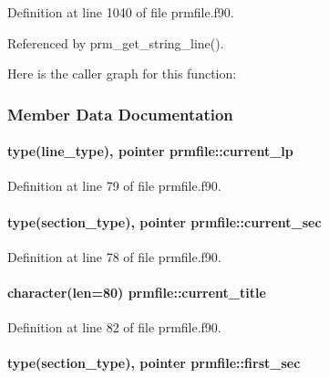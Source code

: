 Definition at line 1040 of file prmfile.\-f90.



Referenced by prm\-\_\-get\-\_\-string\-\_\-line().



Here is the caller graph for this function\-:




\subsubsection{Member Data Documentation}
\hypertarget{classprmfile_a50199e70faf66f6bb161f0c8584321e3}{
\paragraph[{current\-\_\-lp}]{\setlength{\rightskip}{0pt plus 5cm}type({\bf line\-\_\-type}), pointer prmfile\-::current\-\_\-lp}}\label{classprmfile_a50199e70faf66f6bb161f0c8584321e3}


Definition at line 79 of file prmfile.\-f90.

\hypertarget{classprmfile_a579a695a37c5bbf10236c4402c9d6eab}{
\paragraph[{current\-\_\-sec}]{\setlength{\rightskip}{0pt plus 5cm}type({\bf section\-\_\-type}), pointer prmfile\-::current\-\_\-sec}}\label{classprmfile_a579a695a37c5bbf10236c4402c9d6eab}


Definition at line 78 of file prmfile.\-f90.

\hypertarget{classprmfile_a7a562b2223aab72351460a62e10452d5}{
\paragraph[{current\-\_\-title}]{\setlength{\rightskip}{0pt plus 5cm}character(len=80) prmfile\-::current\-\_\-title}}\label{classprmfile_a7a562b2223aab72351460a62e10452d5}


Definition at line 82 of file prmfile.\-f90.

\hypertarget{classprmfile_ad554732d9493ba99cc02ed18dd01d2f7}{
\paragraph[{first\-\_\-sec}]{\setlength{\rightskip}{0pt plus 5cm}type({\bf section\-\_\-type}), pointer prmfile\-::first\-\_\-sec}}\label{classprmfile_ad554732d9493ba99cc02ed18dd01d2f7}



